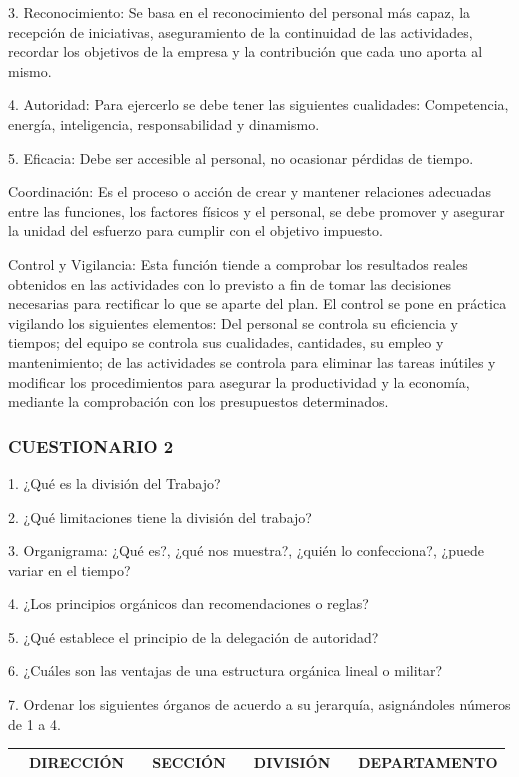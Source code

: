 3. Reconocimiento: Se basa en el reconocimiento del personal más capaz, la recepción de iniciativas, aseguramiento de la continuidad de las actividades, recordar los objetivos de la empresa y la contribución que cada uno aporta al mismo.

4. Autoridad: Para ejercerlo se debe tener las siguientes cualidades: Competencia, energía, inteligencia, responsabilidad y dinamismo.

5. Eficacia: Debe ser accesible al personal, no ocasionar pérdidas de tiempo.

Coordinación: Es el proceso o acción de crear y mantener relaciones adecuadas entre las funciones, los factores físicos y el personal, se debe promover y asegurar la unidad del esfuerzo para cumplir con el objetivo impuesto.

Control y Vigilancia: Esta función tiende a comprobar los resultados reales obtenidos en las actividades con lo previsto a fin de tomar las decisiones necesarias para rectificar lo que se aparte del plan. El control se pone en práctica vigilando los siguientes elementos: Del personal se controla su eficiencia y tiempos; del equipo se controla sus cualidades, cantidades, su empleo y mantenimiento; de las actividades se controla para eliminar las tareas inútiles y modificar los procedimientos para asegurar la productividad y la economía, mediante la comprobación con los presupuestos determinados.



\subsubsection*{CUESTIONARIO 2}
1. ¿Qué es la división del Trabajo?

2. ¿Qué limitaciones tiene la división del trabajo?

3. Organigrama: ¿Qué es?, ¿qué nos muestra?, ¿quién lo confecciona?, ¿puede variar en el tiempo?

4. ¿Los principios orgánicos dan recomendaciones o reglas?

5. ¿Qué establece el principio de la delegación de autoridad?

6. ¿Cuáles son las ventajas de una estructura orgánica lineal o militar?

7. Ordenar los siguientes órganos de acuerdo a su jerarquía, asignándoles números de 1 a 4.


\begin{center}
\small
\begin{tabular}{|p{}|p{}|p{}|p{}|p{}|p{}|p{}|p{}|}
\hline
 & DIRECCIÓN &  & SECCIÓN &  & DIVISIÓN &  & DEPARTAMENTO \\ \hline
\end{tabular}
\end{center}

